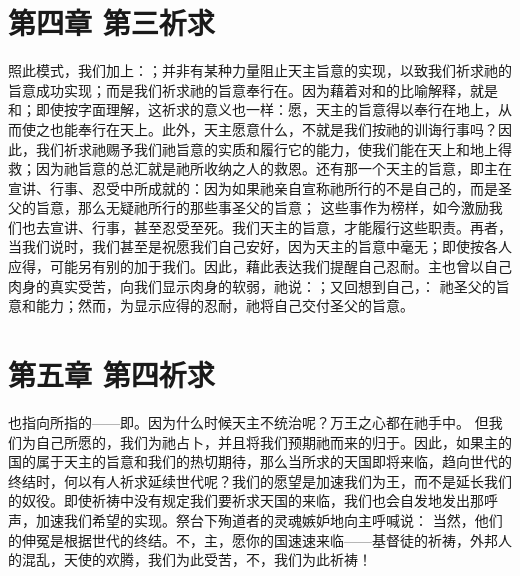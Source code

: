 
\section{第四章 第三祈求}

照此模式，我们加上：；并非有某种力量阻止天主旨意的实现，以致我们祈求祂的旨意成功实现；而是我们祈求祂的旨意奉行在。因为藉着对和的比喻解释，就是和；即使按字面理解，这祈求的意义也一样：愿，天主的旨意得以奉行在地上，从而使之也能奉行在天上。此外，天主愿意什么，不就是我们按祂的训诲行事吗？因此，我们祈求祂赐予我们祂旨意的实质和履行它的能力，使我们能在天上和地上得救；因为祂旨意的总汇就是祂所收纳之人的救恩。还有那一个天主的旨意，即主在宣讲、行事、忍受中所成就的：因为如果祂亲自宣称祂所行的不是自己的，而是圣父的旨意，那么无疑祂所行的那些事圣父的旨意； 这些事作为榜样，如今激励我们也去宣讲、行事，甚至忍受至死。我们天主的旨意，才能履行这些职责。再者，当我们说时，我们甚至是祝愿我们自己安好，因为天主的旨意中毫无；即使按各人应得，可能另有别的加于我们。因此，藉此表达我们提醒自己忍耐。主也曾以自己肉身的真实受苦，向我们显示肉身的软弱，祂说：；又回想到自己，： 祂圣父的旨意和能力；然而，为显示应得的忍耐，祂将自己交付圣父的旨意。\par


\section{第五章 第四祈求}

也指向所指的——即。因为什么时候天主不统治呢？万王之心都在祂手中。 但我们为自己所愿的，我们为祂占卜，并且将我们预期祂而来的归于。因此，如果主的国的属于天主的旨意和我们的热切期待，那么当所求的天国即将来临，趋向世代的终结时，何以有人祈求延续世代呢？我们的愿望是加速我们为王，而不是延长我们的奴役。即使祈祷中没有规定我们要祈求天国的来临，我们也会自发地发出那呼声，加速我们希望的实现。祭台下殉道者的灵魂嫉妒地向主呼喊说： 当然，他们的伸冤是根据世代的终结。不，主，愿你的国速速来临——基督徒的祈祷，外邦人的混乱，天使的欢腾，我们为此受苦，不，我们为此祈祷！\par

